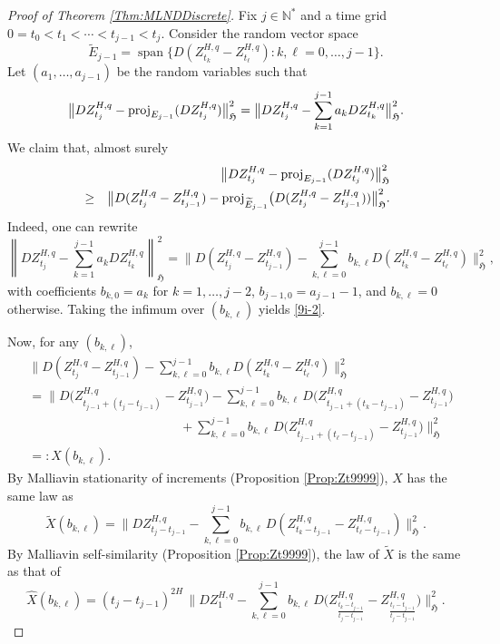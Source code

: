 \documentclass[a4paper,10pt]{article}
\theoremstyle{definition}
\theoremstyle{plain}
\newcommand{\N}{\mathbb{N}}
\newcommand\HHH{\mathfrak{H}}
\newcommand\1{\mathbbm{1}}
\begin{document}
\begin{proof}[Proof of Theorem \ref{Thm:MLNDDiscrete}]
Fix $j\in \N^*$ and a time grid $0=t_0<t_1<\cdots<t_{j-1}<t_j$.  
Consider the random vector space
\[
\widetilde{E}_{j-1}=\operatorname{span}\big\{D(Z^{H,q}_{t_k}-Z^{H,q}_{t_\ell}) : k,\ell=0,\ldots,j-1\big\}.
\] 	
Let $(a_1,\ldots,a_{j-1})$ be the random variables such that 
\[
\big\| D Z^{H,q}_{t_j} - {\rm proj}_{E_{j-1}}(D Z^{H,q}_{t_j}) \big\|_{\HHH}^2
= \big\| D Z^{H,q}_{t_j} - \sum_{k=1}^{j-1} a_k D Z^{H,q}_{t_k} \big\|_{\HHH}^2.
\]
We claim that, almost surely
\begin{eqnarray}
&&\big\| DZ^{H,q}_{t_j} - {\rm proj}_{E_{j-1}}(DZ^{H,q}_{t_j}) \big\|_{\HHH}^2 \notag\\
&\ge& \big\| D(Z^{H,q}_{t_j}-Z^{H,q}_{t_{j-1}}) - {\rm proj}_{\widetilde{E}_{j-1}}\big(D(Z^{H,q}_{t_j}-Z^{H,q}_{t_{j-1}})) \big\|_{\HHH}^2.\label{9i-2}
\end{eqnarray}
Indeed, one can rewrite
\[
\left\| DZ^{H,q}_{t_j} - \sum_{k=1}^{j-1} a_k DZ^{H,q}_{t_k} \right\|_{\HHH}^2 
= \Big\| D(Z^{H,q}_{t_j}-Z^{H,q}_{t_{j-1}}) - \sum_{k,\ell=0}^{j-1} b_{k,\ell} D(Z^{H,q}_{t_k}-Z^{H,q}_{t_\ell}) \Big\|_{\HHH}^2,
\]
with coefficients $b_{k,0}=a_k$ for $k=1,\ldots,j-2$, $b_{j-1,0}=a_{j-1}-1$, and $b_{k,\ell}=0$ otherwise.  
Taking the infimum over $(b_{k,\ell})$ yields \eqref{9i-2}.  

Now, for any $(b_{k,\ell})$,
\begin{align*}
&\Big\| D(Z^{H,q}_{t_j}-Z^{H,q}_{t_{j-1}}) - \sum_{k,\ell=0}^{j-1} b_{k,\ell} D(Z^{H,q}_{t_k}-Z^{H,q}_{t_\ell}) \Big\|_{\HHH}^2 \\
&= \Big\| D\!\big(Z^{H,q}_{t_{j-1}+(t_j-t_{j-1})}-Z^{H,q}_{t_{j-1}}\big) 
     - \sum_{k,\ell=0}^{j-1} b_{k,\ell}\,D\!\big(Z^{H,q}_{t_{j-1}+(t_k-t_{j-1})}-Z^{H,q}_{t_{j-1}}\big) \\
&\hspace{5cm} + \sum_{k,\ell=0}^{j-1} b_{k,\ell}\,D\!\big(Z^{H,q}_{t_{j-1}+(t_\ell-t_{j-1})}-Z^{H,q}_{t_{j-1}}\big)\Big\|_{\HHH}^2\\
&=:X(b_{k,\ell}).
\end{align*}
By Malliavin stationarity of increments (Proposition \ref{Prop:Zt9999}), $X$ has the same law as
\[
\widetilde{X}(b_{k,\ell})=\Big\| DZ^{H,q}_{t_j-t_{j-1}} - \sum_{k,\ell=0}^{j-1} b_{k,\ell}\,D(Z^{H,q}_{t_k-t_{j-1}}-Z^{H,q}_{t_\ell-t_{j-1}})\Big\|_{\HHH}^2.
\]
By Malliavin self-similarity  (Proposition \ref{Prop:Zt9999}), the law of $\widetilde{X}$ is the same as that of
\[
\hat{X}(b_{k,\ell})=(t_j-t_{j-1})^{2H}\,\Big\| DZ^{H,q}_{1} - \sum_{k,\ell=0}^{j-1} b_{k,\ell}\,D\!\Big(Z^{H,q}_{\frac{t_k-t_{j-1}}{t_j-t_{j-1}}}-Z^{H,q}_{\frac{t_\ell-t_{j-1}}{t_j-t_{j-1}}}\Big)\Big\|_{\HHH}^2.
\]


\end{proof}
\end{document}
